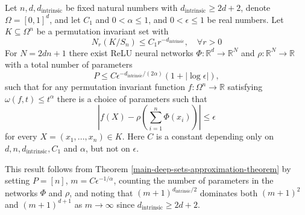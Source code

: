 \documentclass[twoside,11pt]{article}
\newcommand{\dint}{d_{\text{intrinsic}}}
\begin{document}
\begin{cor}\label{deep-sets-corollary}
    Let $n,d,\dint$ be fixed natural numbers with $\dint\geq 2d+2 $, denote $\Omega = [0,1]^d$, and let $C_1$ and $0 < \alpha \leq 1$, and $0 < \epsilon \leq 1$ be real numbers. Let $K\subseteq \Omega^n$ be a permutation invariant set with 
    \begin{equation}\label{eq:coveringK}
    N_r(K/S_n)\leq C_1r^{-\dint}, \quad \forall r>0 \end{equation}
    For $N = 2dn+1$ there exist ReLU neural networks $\Phi:\mathbb{R}^d\rightarrow \mathbb{R}^N$ and $\rho:\mathbb{R}^N\rightarrow \mathbb{R}$ with a total number of parameters $$P\leq C\epsilon^{-\dint/(2\alpha)}(1+|\log\epsilon|),$$ such that for any permutation invariant function $f:\Omega^n\rightarrow \mathbb{R}$ satisfying $\omega(f,t) \leq t^\alpha$ there is a choice of parameters such that
    \begin{equation}
        \left|f(X) - \rho\left(\sum_{i=1}^n \Phi(x_i)\right)\right| \leq \epsilon
    \end{equation}
    for every $X = (x_1,...,x_n)\in K$. Here $C$ is a constant depending only on $d,n,\dint,C_1$ and $\alpha$, but not on $\epsilon$.
\end{cor}
This result follows from Theorem \ref{main-deep-sets-approximation-theorem} by setting $P = [n]$, $m = C\epsilon^{-1/\alpha}$, counting the number of parameters in the networks $\Phi$ and $\rho$, and noting that $(m+1)^{\dint/2}$ dominates both $(m+1)^2$ and $(m+1)^{d+1}$ as $m\rightarrow \infty$ since $\dint \geq 2d+2$. 
\end{document}
